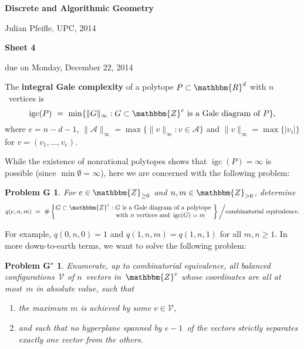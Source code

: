\documentclass[11pt]{amsart}
\newcommand{\R}{\mathbbm{R}}
\newcommand{\Z}{\mathbbm{Z}}
\newcommand{\VV}{\mathcal{V}}
\DeclareMathOperator{\igc}{igc}
\newcommand{\defn}[1]{\textbf{\color{blue}#1}} %
\newtheorem*{problemG}{Problem G}
\newtheorem*{problemG*}{Problem G$^\star$}
\begin{document}
\begin{center}
\textbf{\sffamily
   Discrete and Algorithmic Geometry }

\medskip
   Julian Pfeifle,
   UPC, 2014 \mbox{}
\end{center}

\bigskip

\begin{center}
  \textbf{\sffamily Sheet 4}

\bigskip
 due on Monday, December 22, 2014

\end{center}

\bigskip
\bigskip

The \defn{integral Gale complexity} of a polytope $P\subset\R^d$ with $n$~vertices is
\[
   \igc(P)
   \ = \
   \min\{\|G\|_\infty : G \subset\Z^e \text{ is a Gale diagram of } P\}, 
\]
where $e=n-d-1$, $\|\mathcal A\|_\infty = \max\{\|v\|_\infty : v\in\mathcal A\}$ and $\|v\|_\infty = \max\{|v_i|\}$ for $v=(v_1,\dots,v_e)$.

While the existence of nonrational polytopes shows that $\igc(P)=\infty$ is possible (since $\min\emptyset=\infty$), here we are concerned with the following problem:

\begin{problemG}
  For $e\in\Z_{\ge0}$ and $n, m\in\Z_{>0}$, determine 
  \[
     q(e,n,m)
     \ = \
     \#\left\{
     \begin{matrix}
       G\subset\Z^e : G \text{ is a Gale diagram of a polytope } \\
       \phantom{G\subset\Z^e}\!\!\text{with          $n$ vertices and } \igc(G)=m
     \end{matrix}
     \right\} \bigg/ \text{combinatorial equivalence}.
  \]
\end{problemG}

\noindent For example, $q(0,n,0) = 1$ and $q(1,n,m)=q(1,n,1)$ for all $m,n\ge1$. In more down-to-earth terms, we want to solve the following problem:

\begin{problemG*}
  Enumerate, up to combinatorial equivalence, all balanced   configurations~$\VV$ of $n$~vectors in~$\Z^e$ whose coordinates are   all at most~$m$ in absolute value, such that
\begin{enumerate}
\item the maximum $m$ is achieved by some $v\in\VV$, 
\item and such that no hyperplane spanned by $e-1$~of the vectors   strictly separates exactly one vector from the others.
\end{enumerate}
\end{problemG*}
\end{document}
